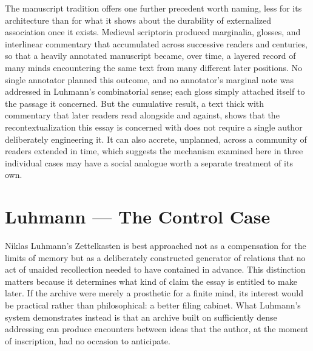 \documentclass[11pt]{article}
\begin{document}
The manuscript tradition offers one further precedent worth naming, less for its architecture than for what it shows about the durability of externalized association once it exists. Medieval scriptoria produced marginalia, glosses, and interlinear commentary that accumulated across successive readers and centuries, so that a heavily annotated manuscript became, over time, a layered record of many minds encountering the same text from many different later positions. No single annotator planned this outcome, and no annotator's marginal note was addressed in Luhmann's combinatorial sense; each gloss simply attached itself to the passage it concerned. But the cumulative result, a text thick with commentary that later readers read alongside and against, shows that the recontextualization this essay is concerned with does not require a single author deliberately engineering it. It can also accrete, unplanned, across a community of readers extended in time, which suggests the mechanism examined here in three individual cases may have a social analogue worth a separate treatment of its own.

\section{Luhmann --- The Control Case}

Niklas Luhmann's Zettelkasten is best approached not as a compensation for the limits of memory but as a deliberately constructed generator of relations that no act of unaided recollection needed to have contained in advance. This distinction matters because it determines what kind of claim the essay is entitled to make later. If the archive were merely a prosthetic for a finite mind, its interest would be practical rather than philosophical: a better filing cabinet. What Luhmann's system demonstrates instead is that an archive built on sufficiently dense addressing can produce encounters between ideas that the author, at the moment of inscription, had no occasion to anticipate.
\end{document}
